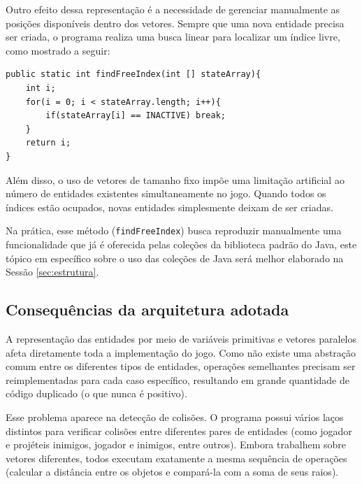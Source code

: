 Outro efeito dessa representação é a necessidade de gerenciar manualmente as
posições disponíveis dentro dos vetores. Sempre que uma nova entidade precisa
ser criada, o programa realiza uma busca linear para localizar um índice livre,
como mostrado a seguir:

\begin{lstlisting}[caption={Busca manual por um índice livre no vetor (Main.java)}]
public static int findFreeIndex(int [] stateArray){
    int i;
    for(i = 0; i < stateArray.length; i++){
        if(stateArray[i] == INACTIVE) break;
    }
    return i;
}
\end{lstlisting}

Além disso, o uso de vetores de tamanho fixo impõe uma limitação artificial ao
número de entidades existentes simultaneamente no jogo. Quando todos os índices
estão ocupados, novas entidades simplesmente deixam de ser criadas.

Na prática, esse método (\texttt{findFreeIndex}) busca reproduzir manualmente uma funcionalidade que já é
oferecida pelas coleções da biblioteca padrão do Java, este tópico em específico sobre o uso das coleções de Java será melhor elaborado na Sessão \ref{sec:estrutura}.

\subsection{Consequências da arquitetura adotada}

A representação das entidades por meio de variáveis primitivas e vetores
paralelos afeta diretamente toda a implementação do jogo. Como não existe uma
abstração comum entre os diferentes tipos de entidades, operações semelhantes
precisam ser reimplementadas para cada caso específico, resultando em grande
quantidade de código duplicado (o que nunca é positivo).

Esse problema aparece na detecção de colisões. O programa
possui vários laços distintos para verificar colisões entre diferentes pares de
entidades (como jogador e projéteis inimigos, jogador e inimigos, entre outros). Embora trabalhem sobre vetores diferentes, todos
executam exatamente a mesma sequência de operações (calcular a distância entre
os objetos e compará-la com a soma de seus raios).

